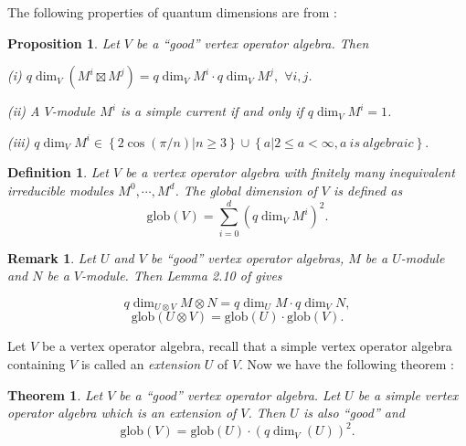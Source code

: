 \documentclass{article}
\newtheorem{theorem}[lemma]{Theorem}
\newtheorem{proposition}[lemma]{Proposition}
\newtheorem{definition}[lemma]{Definition}
\newtheorem{remark}[lemma]{Remark}
\begin{document}
	The following properties of quantum dimensions are from \cite{DJX}
	:
	
	\begin{proposition} \label{product property of quantum dimension }\label{quantum dimension and simple current}
		Let $V$ be a ``good'' vertex operator algebra. Then
		
		(i) $q\dim_{V}\left(M^{i}\boxtimes M^{j}\right)=q\dim_{V}M^{i}\cdot q\dim_{V}M^{j},$
		$\forall i,j$.
		
		(ii) A $V$-module $M^{i}$ is a simple current if and only if $q\dim_{V}M^{i}=1$.
		
		(iii) $q\dim_{V}M^{i}\in\left\{ 2\cos\left(\pi/n\right)|n\ge3\right\} \cup\left\{ a|2\le a<\infty,a\ is\ algebraic\right\} .$
		
	\end{proposition}
	
	\begin{definition} Let $V$ be a vertex operator algebra with finitely
		many inequivalent irreducible modules $M^{0},\cdots,M^{d}$. The \emph{global
			dimension} of $V$ is defined as
		\[
		\text{glob}\left(V\right)=\sum_{i=0}^{d}\left(q\dim_{V}M^{i}\right)^{2}.
		\]
	\end{definition}
	
	\begin{remark} \label{product property of global dimension}Let $U$
		and $V$ be ``good'' vertex operator algebras, $M$ be a $U$-module
		and $N$ be a $V$-module. Then Lemma 2.10 of \rm{\cite{ADJR}} gives
		
		\[
		q\dim_{U\otimes V}M\otimes N=q\dim_{U}M\cdot q\dim_{V}N,
		\]
		\[
		\text{glob}\left(U\otimes V\right)=\text{glob}\left(U\right)\cdot\text{glob}\left(V\right).
		\]
	\end{remark}
	
	Let $V$ be a vertex operator algebra, recall that a simple vertex
	operator algebra containing $V$ is called an \emph{extension} $U$
	of $V$. Now we have the following theorem \cite{ABD,HKL,ADJR}:
	
	\begin{theorem} \label{rationality of extesnion of VOA } \label{global dim of VOA and subVOA}
		Let $V$ be a ``good'' vertex operator algebra. Let $U$ be a simple
		vertex operator algebra which is an extension of $V$. Then $U$ is
		also ``good'' and
		\[
		\text{glob}\left(V\right)=\text{glob}\left(U\right)\cdot\left(q\dim_{V}\left(U\right)\right)^{2}.
		\]
		
	\end{theorem}
	
\end{document}
